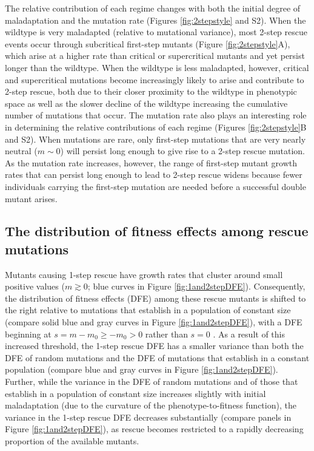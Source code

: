 \documentclass[9pt,twocolumn,twoside,lineno]{gsajnl}
\begin{document}
The relative contribution of each regime changes with both the initial degree of maladaptation and the mutation rate (Figures \ref{fig:2stepstyle} and S2).
When the wildtype is very maladapted (relative to mutational variance), most 2-step rescue events occur through subcritical first-step mutants (Figure \ref{fig:2stepstyle}A), which arise at a higher rate than critical or supercritical mutants and yet persist longer than the wildtype.
When the wildtype is less maladapted, however, critical and supercritical mutations become increasingly likely to arise and contribute to 2-step rescue, both due to their closer proximity to the wildtype in phenotypic space as well as the slower decline of the wildtype increasing the cumulative number of mutations that occur. 
The mutation rate also plays an interesting role in determining the relative contributions of each regime (Figures \ref{fig:2stepstyle}B and S2). 
When mutations are rare, only first-step mutations that are very nearly neutral ($m\sim0$) will persist long enough to give rise to a 2-step rescue mutation. 
As the mutation rate increases, however, the range of first-step mutant growth rates that can persist long enough to lead to 2-step rescue widens because fewer individuals carrying the first-step mutation are needed before a successful double mutant arises.

\subsection{The distribution of fitness effects among rescue mutations}

Mutants causing 1-step rescue have growth rates that cluster around small positive values ($m\gtrsim 0$; blue curves in Figure \ref{fig:1and2stepDFE}).
Consequently, the distribution of fitness effects (DFE) among these rescue mutants is shifted to the right relative to mutations that establish in a population of constant size (compare solid blue and gray curves in Figure \ref{fig:1and2stepDFE}), with a DFE beginning at $s = m - m_0 \geq -m_0 > 0$ rather than $s=0$ \citep{Kimura1983}.
As a result of this increased threshold, the 1-step rescue DFE has a smaller variance than both the DFE of random mutations and the DFE of mutations that establish in a constant population (compare blue and gray curves in Figure \ref{fig:1and2stepDFE}). 
Further, while the variance in the DFE of random mutations and of those that establish in a population of constant size increases slightly with initial maladaptation (due to the curvature of the phenotype-to-fitness function), the variance in the 1-step rescue DFE decreases substantially (compare panels in Figure \ref{fig:1and2stepDFE}), as rescue becomes restricted to a rapidly decreasing proportion of the available mutants.
\end{document}
